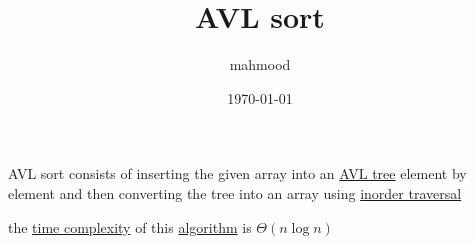 \documentclass[a4paper,12pt]{article}
\author{mahmood}
\date{\today}
\title{AVL sort}
\begin{document}
\maketitle
AVL sort consists of inserting the given array into an \href{data_structures.org}{AVL tree} element by element and then converting the tree into an array using \href{data_structures.org}{inorder traversal}\\
\begin{lemma}
the \href{20221130014441-time_complexity.org}{time complexity} of this \href{20220706211958-algorithm.org}{algorithm} is \(\Theta(n\log n)\)\\
\end{lemma}
\end{document}

